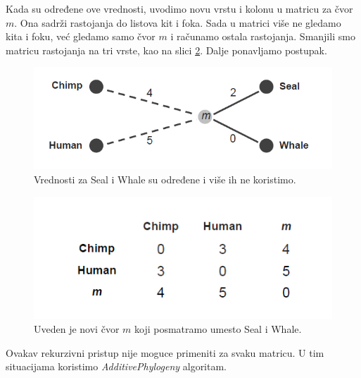 Kada su određene ove vrednosti, uvodimo novu vrstu i kolonu u matricu za čvor $m$. Ona sadrži rastojanja do listova kit i foka. Sada u matrici više ne gledamo kita i foku, već gledamo samo čvor $m$ i računamo ostala rastojanja. Smanjili smo matricu rastojanja na tri vrste, kao na slici \ref{fig:mala}. Dalje ponavljamo postupak. 


\begin{minipage}{\textwidth}
	\centering
	\begin{minipage}{0.45\textwidth}
		\begin{figure}[H]
			\centering
			\includegraphics[width=\textwidth]{poglavlja/7/slike/humanChimp.png}
			\caption{Vrednosti za Seal i Whale su određene i više ih ne koristimo.}
			\label{slika:rekurzivno}
		\end{figure} 
	\end{minipage}
	\hfill 
	\begin{minipage}{0.45\textwidth}
		\begin{figure}[H]
			\centering
			\includegraphics[width=\textwidth]{poglavlja/7/slike/malaMatrica.png}
			\caption{Uveden je novi čvor $m$ koji posmatramo umesto Seal i Whale.}
			\label{fig:mala}
		\end{figure}  
	\end{minipage}
	\vspace*{1em}
\end{minipage}


Ovakav rekurzivni pristup nije moguce primeniti za svaku matricu. U tim situacijama koristimo \textit{AdditivePhylogeny} algoritam.

